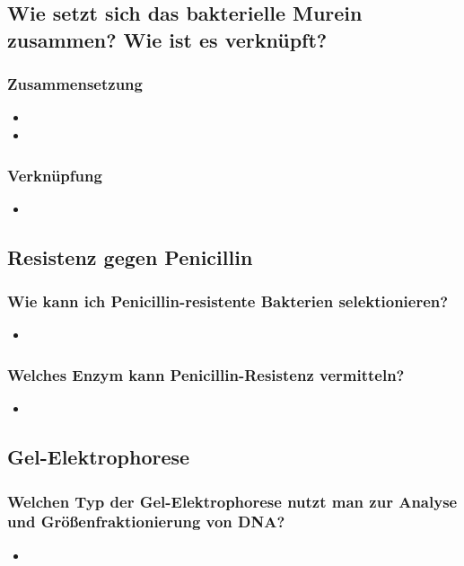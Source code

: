 \documentclass{article}
\begin{document}
\subsection*{Wie setzt sich das bakterielle Murein
zusammen? Wie ist es verknüpft?}
\subsubsection{Zusammensetzung}
\begin{itemize}
    \item 
    \item 
\end{itemize}
\subsubsection{Verknüpfung}
\begin{itemize}
    \item 
\end{itemize}
\subsection*{Resistenz gegen Penicillin}
\subsubsection*{Wie kann ich Penicillin-resistente Bakterien
selektionieren?}
\begin{itemize}     \item  \end{itemize}
\subsubsection*{Welches Enzym kann Penicillin-Resistenz
vermitteln?}
\begin{itemize}     \item  \end{itemize}
\subsection*{Gel-Elektrophorese}
\subsubsection*{Welchen Typ der Gel-Elektrophorese nutzt
man zur Analyse und Größenfraktionierung
von DNA?}
\begin{itemize}     \item  \end{itemize}
\end{document}
